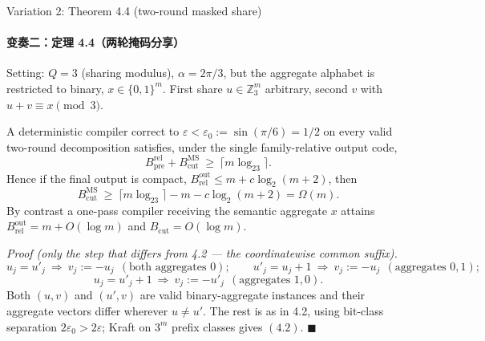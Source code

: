 \documentclass[aspectratio=169,10pt]{beamer}
\newif\ifzh \zhfalse
\newcommand{\bl}[2]{\ifzh #2\else #1\fi}
\theoremstyle{definition}
\newenvironment{prf}[1][Proof]%
  {\par\smallskip\noindent\textit{#1.}\ \ignorespaces}%
  {\hfill$\blacksquare$\par\smallskip}
\newcommand{\Bcut}{B_{\mathrm{cut}}}
\newcommand{\zhsub}[1]{\ifzh\else\framesubtitle{#1}\fi}
\begin{document}
\begin{frame}{\bl{Variation 2: Theorem 4.4 (two-round masked share)}%
                {变奏二：定理 4.4（两轮掩码分享）}}
  \zhsub{变奏二：定理 4.4（两轮掩码分享）}
  \scriptsize
  Setting: $Q=3$ (sharing modulus), $\alpha=2\pi/3$, but the \alert{aggregate
  alphabet is restricted to binary}, $x\in\{0,1\}^m$. First share
  $u\in\mathbb{Z}_3^m$ arbitrary, second $v$ with $u+v\equiv x\pmod3$.
  \begin{theorem}
    A deterministic compiler correct to
    $\varepsilon<\varepsilon_0:=\sin(\pi/6)=1/2$ on every valid two-round
    decomposition satisfies, under the single family-relative output code,
    \begin{equation}
      B^{\mathrm{rel}}_{\mathrm{pre}}+B^{\mathrm{MS}}_{\mathrm{cut}}
      \ \ge\ \lceil m\log_23\rceil.\tag{4.2}
    \end{equation}
    Hence if the final output is \alert{compact},
    $B^{\mathrm{out}}_{\mathrm{rel}}\le m+c\log_2(m+2)$, then
    \begin{equation}
      B^{\mathrm{MS}}_{\mathrm{cut}}
      \ \ge\ \lceil m\log_23\rceil-m-c\log_2(m+2)=\Omega(m).\tag{4.3}
    \end{equation}
    By contrast a one-pass compiler receiving the semantic aggregate $x$
    attains $B^{\mathrm{out}}_{\mathrm{rel}}=m+O(\log m)$ \alert{and}
    $\Bcut=O(\log m)$.
  \end{theorem}
  \begin{prf}[Proof (only the step that differs from 4.2 --- the
              coordinatewise common suffix)]
    \[ u_j=u'_j\ \Rightarrow\ v_j:=-u_j\ \ (\text{both aggregates }0);\qquad
       u'_j=u_j+1\ \Rightarrow\ v_j:=-u_j\ \ (\text{aggregates }0,1); \]
    \[ u_j=u'_j+1\ \Rightarrow\ v_j:=-u'_j\ \ (\text{aggregates }1,0). \]
    Both $(u,v)$ and $(u',v)$ are valid \alert{binary}-aggregate instances and
    their aggregate vectors differ wherever $u\ne u'$. The rest is as in 4.2,
    using bit-class separation $2\varepsilon_0>2\varepsilon$; Kraft on $3^m$
    prefix classes gives $(4.2)$.
  \end{prf}
\end{frame}
\end{document}
